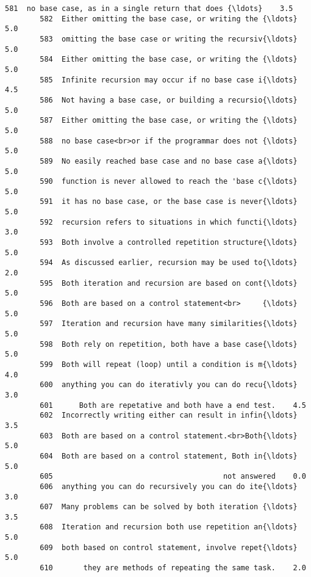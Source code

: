 \documentclass[11pt]{article}
\begin{document}
\begin{Verbatim}[commandchars=\\\{\}]
        581  no base case, as in a single return that does {\ldots}    3.5   
        582  Either omitting the base case, or writing the {\ldots}    5.0   
        583  omitting the base case or writing the recursiv{\ldots}    5.0   
        584  Either omitting the base case, or writing the {\ldots}    5.0   
        585  Infinite recursion may occur if no base case i{\ldots}    4.5   
        586  Not having a base case, or building a recursio{\ldots}    5.0   
        587  Either omitting the base case, or writing the {\ldots}    5.0   
        588  no base case<br>or if the programmar does not {\ldots}    5.0   
        589  No easily reached base case and no base case a{\ldots}    5.0   
        590  function is never allowed to reach the 'base c{\ldots}    5.0   
        591  it has no base case, or the base case is never{\ldots}    5.0   
        592  recursion refers to situations in which functi{\ldots}    3.0   
        593  Both involve a controlled repetition structure{\ldots}    5.0   
        594  As discussed earlier, recursion may be used to{\ldots}    2.0   
        595  Both iteration and recursion are based on cont{\ldots}    5.0   
        596  Both are based on a control statement<br>     {\ldots}    5.0   
        597  Iteration and recursion have many similarities{\ldots}    5.0   
        598  Both rely on repetition, both have a base case{\ldots}    5.0   
        599  Both will repeat (loop) until a condition is m{\ldots}    4.0   
        600  anything you can do iterativly you can do recu{\ldots}    3.0   
        601      Both are repetative and both have a end test.    4.5   
        602  Incorrectly writing either can result in infin{\ldots}    3.5   
        603  Both are based on a control statement.<br>Both{\ldots}    5.0   
        604  Both are based on a control statement, Both in{\ldots}    5.0   
        605                                       not answered    0.0   
        606  anything you can do recursively you can do ite{\ldots}    3.0   
        607  Many problems can be solved by both iteration {\ldots}    3.5   
        608  Iteration and recursion both use repetition an{\ldots}    5.0   
        609  both based on control statement, involve repet{\ldots}    5.0   
        610       they are methods of repeating the same task.    2.0   
        

\end{Verbatim}
\end{document}
